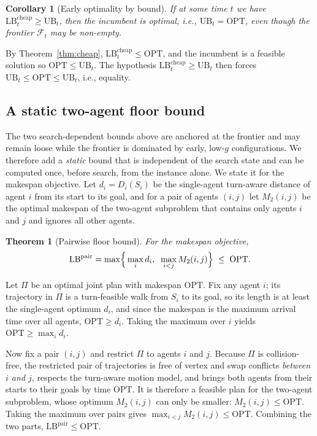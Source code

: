 \documentclass[lettersize,journal]{IEEEtran}
\makeatletter
\newtheorem{theorem}{\textbf{Theorem}}
\newtheorem{corollary}{Corollary}
\renewenvironment{proof}[1][\proofname]{\par
  \pushQED{\qed}%
  \normalfont \topsep6\p@\@plus6\p@\relax
  \trivlist
  \item[\hskip\parindent
        \itshape
    #1\@addpunct{.}]\ignorespaces
}{%
  \popQED\endtrivlist\@endparpenalty\z@
}
\makeatother
\begin{document}
\begin{corollary}[Early optimality by bound]
\label{cor:by_bound}
If at some time $t$ we have $\mathrm{LB}_t^{\mathrm{cheap}}\ge \mathrm{UB}_t$, then the incumbent is optimal, i.e., $\mathrm{UB}_t=\mathrm{OPT}$, even though the frontier $\mathcal{F}_t$ may be non-empty.
\end{corollary}
\begin{proof}
By Theorem~\ref{thm:cheap}, $\mathrm{LB}_t^{\mathrm{cheap}}\le \mathrm{OPT}$, and the incumbent is a feasible solution so $\mathrm{OPT}\le \mathrm{UB}_t$. The hypothesis $\mathrm{LB}_t^{\mathrm{cheap}}\ge \mathrm{UB}_t$ then forces $\mathrm{UB}_t\le \mathrm{OPT}\le \mathrm{UB}_t$, i.e., equality.
\end{proof}

\subsection{A static two-agent floor bound}
\label{subsec:lb_pairwise}

The two search-dependent bounds above are anchored at the frontier and may remain loose while the frontier is dominated by early, low-$g$ configurations. We therefore add a \emph{static} bound that is independent of the search state and can be computed once, before search, from the instance alone. We state it for the makespan objective. Let $d_i=D_i(S_i)$ be the single-agent turn-aware distance of agent $i$ from its start to its goal, and for a pair of agents $(i,j)$ let $M_2(i,j)$ be the optimal makespan of the two-agent subproblem that contains only agents $i$ and $j$ and ignores all other agents.

\begin{theorem}[Pairwise floor bound]
\label{thm:pairwise}
For the makespan objective,
\[
\mathrm{LB}^{\mathrm{pair}}
=\max\Bigl\{\,\max_i d_i,\;\;\max_{i<j} M_2(i,j)\Bigr\}\;\le\;\mathrm{OPT}.
\]
\end{theorem}
\begin{proof}
Let $\Pi$ be an optimal joint plan with makespan $\mathrm{OPT}$. Fix any agent $i$; its trajectory in $\Pi$ is a turn-feasible walk from $S_i$ to its goal, so its length is at least the single-agent optimum $d_i$, and since the makespan is the maximum arrival time over all agents, $\mathrm{OPT}\ge d_i$. Taking the maximum over $i$ yields $\mathrm{OPT}\ge\max_i d_i$.

Now fix a pair $(i,j)$ and restrict $\Pi$ to agents $i$ and $j$. Because $\Pi$ is collision-free, the restricted pair of trajectories is free of vertex and swap conflicts \emph{between $i$ and $j$}, respects the turn-aware motion model, and brings both agents from their starts to their goals by time $\mathrm{OPT}$. It is therefore a feasible plan for the two-agent subproblem, whose optimum $M_2(i,j)$ can only be smaller: $M_2(i,j)\le\mathrm{OPT}$. Taking the maximum over pairs gives $\max_{i<j}M_2(i,j)\le\mathrm{OPT}$. Combining the two parts, $\mathrm{LB}^{\mathrm{pair}}\le\mathrm{OPT}$.
\end{proof}
\end{document}
